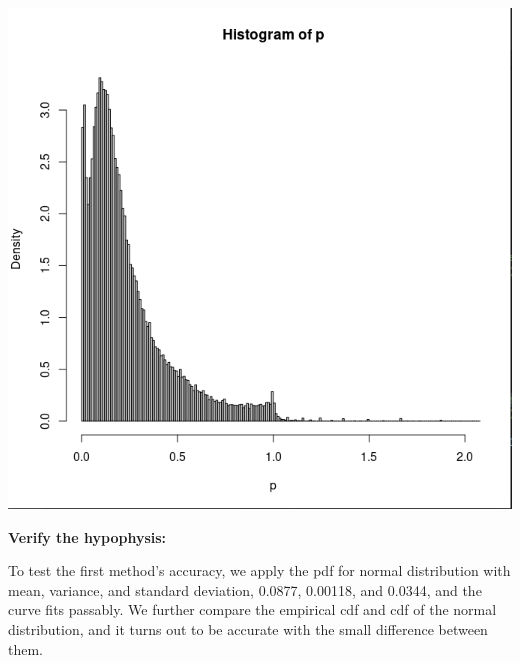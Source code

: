 \documentclass[11pt]{article}
\begin{document}
\noindent\includegraphics[scale=.5]{hist_p2_m2.png}\\
\newpage

\noindent\textbf{Verify the hypophysis:}\\
\par
To test the first method's accuracy, we apply the pdf for normal distribution with mean, variance, and standard deviation,
0.0877, 0.00118, and 0.0344, and the curve fits passably. We further compare the empirical cdf and cdf of the normal distribution,
and it turns out to be accurate with the small difference between them. \\
\end{document}
